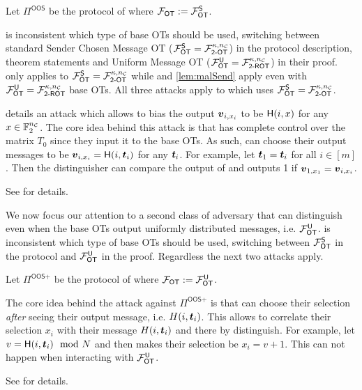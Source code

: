 \begin{definition}\label{def:OOS}
	Let $\Pi^{\textsf{OOS}}$ be the protocol of  where $\OOT:=\OOT^\send$.
\end{definition}

\iffullversion
\begin{remark}\label{remark:oosROT}
	\cite{RSA:OrrOrsSch17} is inconsistent which type of base OTs should be used, switching between standard Sender Chosen Message OT ($\OOT^\send=\mathcal{F}^{\kappa,\nc}_{\textsf{2-OT}}$) in the protocol description, theorem statements and Uniform Message OT ($\OOT^\U=\mathcal{F}^{\kappa,\nc}_{\textsf{2-ROT}}$) in their proof.  only applies to $\OOT^\send=\mathcal{F}^{\kappa,\nc}_{\textsf{2-OT}}$ while  and \ref{lem:malSend} apply even with $\OOT^\U=\mathcal{F}^{\kappa,\nc}_{\textsf{2-ROT}}$ base OTs. All three attacks apply to \cite{C:KelOrsSch15} which uses $\OOT^\send=\mathcal{F}^{\kappa,\nc}_{\textsf{2-OT}}$.
\end{remark}
\fi


 details an attack which allows \rec to bias the output $\vv_{i,x_i}$ to be $\H(i,x)$ for any $x\in\mathbb{F}^{\nc}_2$. The core idea behind this attack is that \rec has complete control over the matrix $T_0$ since they input it to the base OTs. As such, \rec can choose their output messages to be $\vv_{i,x_i}=\H(i,\tt_i)$ for any $\tt_i$. For example, let $\tt_1=\tt_{i}$ for all $i\in[m]$. Then the distinguisher can compare the output of \send and  outputs 1 if $\vv_{1,x_1}=\vv_{i,x_{i}}$. 
\iffullversion

\else
See  for details.
\fi




We now focus our attention to a second class of adversary that can distinguish even when the base OTs output uniformly distributed messages, i.e. $\OOT^\U$. \cite{RSA:OrrOrsSch17} is inconsistent which type of base OTs should be used, switching between $\OOT^\send$ in the protocol and $\OOT^\U$ in the proof. Regardless the next two attacks apply. 
\begin{definition}\label{def:OOS2}
	Let $\Pi^{\textsf{OOS+}}$ be the protocol of  where $\OOT:=\OOT^\U$.
\end{definition}
The core idea behind the  attack against $\Pi^{\textsf{OOS+}}$ is that \rec can choose their selection \emph{after} seeing their output message, i.e. $H(i,\tt_i)$. This allows \rec to correlate their selection $x_i$ with their message $H(i,\tt_i)$ and there by distinguish. For example, let $v=\H(i,\tt_i)\mod N$ and then \rec makes their selection be $x_i=v+1$. This can not happen when interacting with $\OOT^\U$. 
\iffullversion

\else
See  for details.
\fi




